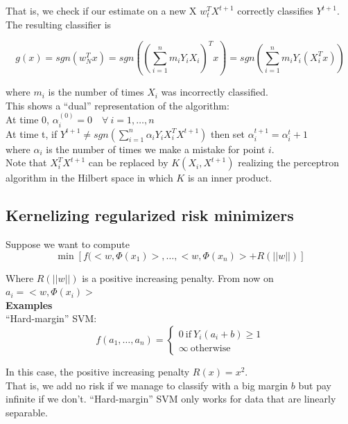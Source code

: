 \documentclass[11pt, english]{article}
\begin{document}
That is, we check if our estimate on a new X $w^T_t X^{t+1}$ correctly classifies $Y^{t+1}$. The resulting classifier is

\begin{equation}
g(x) = sgn(w_N^T x) = sgn((\sum_{i=1}^{n} m_i Y_i X_i)^T x) = sgn(\sum_{i=1}^{n}m_i Y_i(X_i^Tx))
\end{equation}

where $m_i$ is the number of times $X_i$ was incorrectly classified.\\

This shows a ``dual'' representation of the algorithm:\\

At time 0, $\alpha_i^{(0)} = 0 \quad \forall \ i = 1, \dots, n$\\
At time t, if $Y^{t+1} \neq sgn(\sum_{i=1}^{n} \alpha_i Y_i X_i^TX^{t+1}) $ then set $\alpha_i^{t+1} = \alpha_i^t + 1$\\

where $\alpha_i$ is the number of times we make a mistake for point $i$.\\ 

Note that $X_i^TX^{t+1}$ can be replaced by $K(X_i, X^{t+1})$ realizing the perceptron algorithm in the Hilbert space in which $K$ is an inner product.


\subsection{Kernelizing regularized risk minimizers}

Suppose we want to compute
\begin{equation}
	\min[f(<w,\Phi(x_1)>, \dots, <w, \Phi (x_n)>+ R(||w||)]
\end{equation}

Where $ R(||w||)$ is a positive increasing penalty. From now on $a_i = <w,\Phi(x_i)>$\\

\textbf{Examples} \\
``Hard-margin'' SVM:
$$f(a_1, \dots, a_n) = \begin{cases}
0\ \text{if}\ Y_i(a_i + b)\geq 1\\
\infty \ \text{otherwise}
\end{cases}$$

In this case, the positive increasing penalty $R(x) = x^2$.\\

That is, we add no risk if we manage to classify with a big margin $b$ but pay infinite if we don't. ``Hard-margin'' SVM only works for data that are linearly separable.\\
\end{document}
